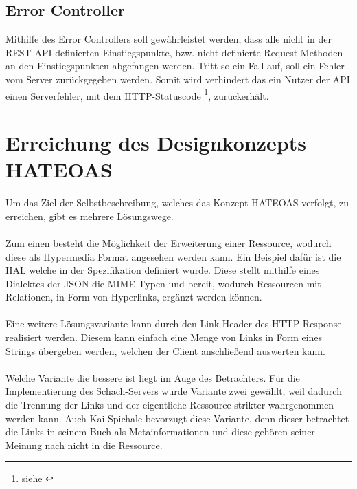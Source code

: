 \subsection{Error Controller}\label{sec:errorController}
Mithilfe des Error Controllers soll gewährleistet werden, dass alle nicht in der \gls{REST}-\gls{API} definierten Einstiegspunkte, bzw. nicht definierte Request-Methoden an den Einstiegspunkten abgefangen werden. Tritt so ein Fall auf, soll ein Fehler vom Server zurückgegeben werden. Somit wird verhindert das ein Nutzer der \gls{API} einen Serverfehler, mit dem HTTP-Statuscode \footnote{siehe \cite[A.2.5]{kretzschmar}}, zurückerhält.

\section{Erreichung des Designkonzepts HATEOAS}\label{sec:konzeptHATEOAS}
Um das Ziel der Selbstbeschreibung, welches das Konzept HATEOAS verfolgt, zu erreichen, gibt es mehrere Lösungswege.\\
\\
Zum einen besteht die Möglichkeit der Erweiterung einer Ressource, wodurch diese als Hypermedia Format angesehen werden kann. Ein Beispiel dafür ist die \gls{HAL} welche in der Spezifikation \cite{halSpezification} definiert wurde. Diese stellt mithilfe eines Dialektes der \gls{JSON} die \gls{MIME} Typen  und  bereit, wodurch Ressourcen mit Relationen, in Form von Hyperlinks, ergänzt werden können.\\
\\
Eine weitere Lösungsvariante kann durch den Link-Header des \gls{HTTP}-Response realisiert werden. Diesem kann einfach eine Menge von Links in Form eines Strings übergeben werden, welchen der Client anschließend auswerten kann.\\
\\
Welche Variante die bessere ist liegt im Auge des Betrachters. Für die Implementierung des Schach-Servers wurde Variante zwei gewählt, weil dadurch die Trennung der Links und der eigentliche Ressource strikter wahrgenommen werden kann. Auch Kai Spichale bevorzugt diese Variante, denn dieser betrachtet die Links in seinem Buch \cite[158]{apiDesign} als Metainformationen und diese gehören seiner Meinung nach nicht in die Ressource.